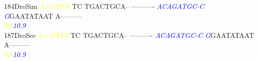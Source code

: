 \documentclass[11pt,twoside,reqno,a4paper]{article}
\begin{document}
{184\hspace*{1\charwidth}DroSim	\textcolor{Yellow}{A}\textcolor{Yellow}{-}\textcolor{Yellow}{-}\textcolor{Yellow}{-}\textcolor{Yellow}{C}\textcolor{Yellow}{T}\textcolor{Yellow}{C}\textcolor{Yellow}{C}TC	TGACTGCA--	----------	\textit{\textcolor{Blue}{A}}\textit{\textcolor{Blue}{C}}\textit{\textcolor{Blue}{A}}\textit{\textcolor{Blue}{G}}\textit{\textcolor{Blue}{A}}\textit{\textcolor{Blue}{T}}\textit{\textcolor{Blue}{G}}\textit{\textcolor{Blue}{C}}\textit{\textcolor{Blue}{-}}\textit{\textcolor{Blue}{C}}	\textit{\textcolor{Blue}{G}}GAATATAAT	A---------	\\
\hspace*{4\charwidth}\hspace*{7\charwidth}\hspace*{0\charwidth}\textcolor{Yellow}{8.8}\hspace*{1\charwidth}\hspace*{1\charwidth}\hspace*{1\charwidth}\hspace*{27\charwidth}\textit{\textcolor{Blue}{10.9}}\hspace*{1\charwidth}\hspace*{1\charwidth}\hspace*{1\charwidth}\\
187\hspace*{1\charwidth}DroSec	\textcolor{Yellow}{A}\textcolor{Yellow}{-}\textcolor{Yellow}{-}\textcolor{Yellow}{-}\textcolor{Yellow}{C}\textcolor{Yellow}{T}\textcolor{Yellow}{C}\textcolor{Yellow}{C}TC	TGACTGCA--	----------	\textit{\textcolor{Blue}{A}}\textit{\textcolor{Blue}{C}}\textit{\textcolor{Blue}{A}}\textit{\textcolor{Blue}{G}}\textit{\textcolor{Blue}{A}}\textit{\textcolor{Blue}{T}}\textit{\textcolor{Blue}{G}}\textit{\textcolor{Blue}{C}}\textit{\textcolor{Blue}{-}}\textit{\textcolor{Blue}{C}}	\textit{\textcolor{Blue}{G}}GAATATAAT	A---------	\\
\hspace*{4\charwidth}\hspace*{7\charwidth}\hspace*{0\charwidth}\textcolor{Yellow}{8.8}\hspace*{1\charwidth}\hspace*{1\charwidth}\hspace*{1\charwidth}\hspace*{27\charwidth}\textit{\textcolor{Blue}{10.9}}\hspace*{1\charwidth}\hspace*{1\charwidth}\hspace*{1\charwidth}\\
}
\end{document}
